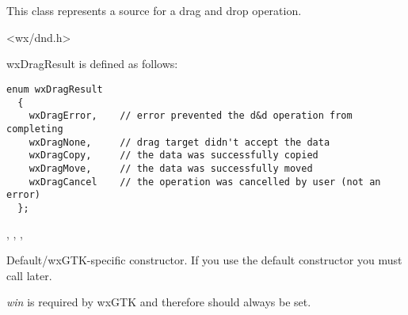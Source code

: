 \section{}\label{wxdropsource}


This class represents a source for a drag and drop operation.




<wx/dnd.h>


wxDragResult is defined as follows:

{\small\begin{verbatim}
enum wxDragResult
  {
    wxDragError,    // error prevented the d&d operation from completing
    wxDragNone,     // drag target didn't accept the data
    wxDragCopy,     // the data was successfully copied
    wxDragMove,     // the data was successfully moved
    wxDragCancel    // the operation was cancelled by user (not an error)
  };
\end{verbatim}%
}


, , 
, 


\label{wxdropsourcewxdropsource}


Default/wxGTK-specific constructor. If you use the default constructor you must
call  later.

{\it win} is required by wxGTK and therefore should always be set.

\label{wxdropsourcedtor}


\label{wxdropsourcesetdata}


